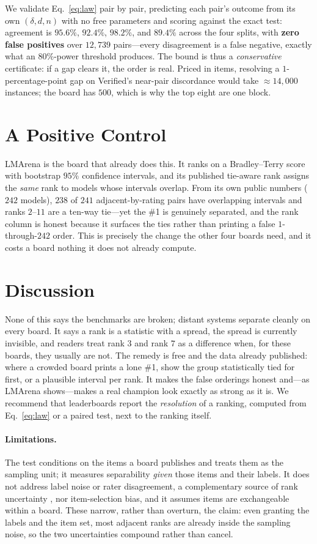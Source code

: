 \documentclass{article}
\begin{document}
We validate Eq.~\eqref{eq:law} pair by pair, predicting each pair's outcome from its own $(\delta,d,n)$
with no free parameters and scoring against the exact test: agreement is $95.6\%$, $92.4\%$, $98.2\%$,
and $89.4\%$ across the four splits, with \textbf{zero false positives} over $12{,}739$ pairs---every
disagreement is a false negative, exactly what an $80\%$-power threshold produces. The bound is thus a
\emph{conservative} certificate: if a gap clears it, the order is real. Priced in items, resolving a
$1$-percentage-point gap on Verified's near-pair discordance would take $\approx 14{,}000$ instances;
the board has $500$, which is why the top eight are one block.

\section{A Positive Control}
\label{sec:lmarena}
LMArena is the board that already does this. It ranks on a Bradley--Terry score with bootstrap $95\%$
confidence intervals, and its published tie-aware rank assigns the \emph{same} rank to models whose
intervals overlap. From its own public numbers ($242$ models), $238$ of $241$ adjacent-by-rating pairs
have overlapping intervals and ranks $2$--$11$ are a ten-way tie---yet the \#1 is genuinely separated,
and the rank column is honest because it surfaces the ties rather than printing a false
$1$-through-$242$ order. This is precisely the change the other four boards need, and it costs a board
nothing it does not already compute.

\section{Discussion}
None of this says the benchmarks are broken; distant systems separate cleanly on every board. It says
a rank is a statistic with a spread, the spread is currently invisible, and readers treat rank $3$ and
rank $7$ as a difference when, for these boards, they usually are not. The remedy is free and the data
already published: where a crowded board prints a lone \#1, show the group statistically tied for
first, or a plausible interval per rank. It makes the false orderings honest and---as LMArena
shows---makes a real champion look exactly as strong as it is. We recommend that leaderboards report
the \emph{resolution} of a ranking, computed from Eq.~\eqref{eq:law} or a paired test, next to the
ranking itself.

\paragraph{Limitations.} The test conditions on the items a board publishes and treats them as the
sampling unit; it measures separability \emph{given} those items and their labels. It does not address
label noise or rater disagreement, a complementary source of rank uncertainty \citep{aroyo2015}, nor
item-selection bias, and it assumes items are exchangeable within a board. These narrow, rather than
overturn, the claim: even granting the labels and the item set, most adjacent ranks are already inside
the sampling noise, so the two uncertainties compound rather than cancel.
\end{document}

